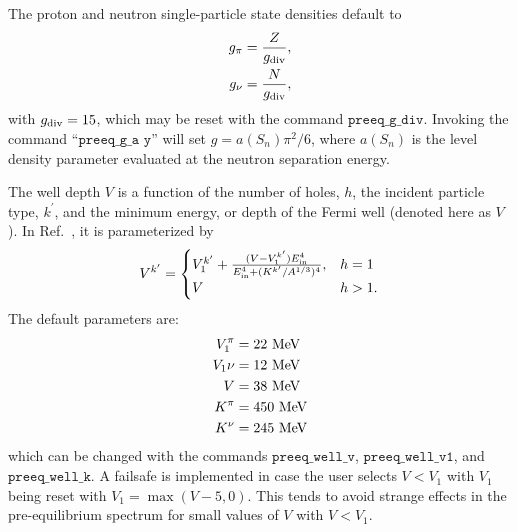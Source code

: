 \documentclass[
10pt,
showpacs,preprintnumbers,footinbib,
amsfonts,amsmath,amssymb,
aps,
prc,twocolumn,groupedaddress,superscriptaddress,
showkeys,
nofootinbib
]{revtex4-1}
\begin{document}
The proton and neutron single-particle state densities default to
\begin{align}
g_\pi & = \frac{Z}{g_{\rm div}},\\
g_\nu & = \frac{N}{g_{\rm div}},
\end{align}
with $g_{\rm div} = 15$, which may be reset with the command ${\texttt{preeq\_g\_div}}$. Invoking the command ``${\texttt{preeq\_g\_a y}}$'' will set $g = a(S_n)\pi^2/6$, where $a(S_n)$ is the level density parameter evaluated at the neutron separation energy.

The well depth $V$ is a function of the number of holes, $h$, the incident particle type, $k^\prime$, and the minimum energy,
or depth of the Fermi well (denoted here as $V$ ). In Ref.~\cite{Koning:2004}, it is parameterized by
\begin{equation}
V^{k^\prime} = 
\begin{cases}
V_1^{k^\prime} + \frac{(V-V_1^{k^\prime})E_{\rm in}^4}{E_{\rm in}^4 + (K^{k^\prime}/A^{1/3})^4}, & h = 1 \\
V  & h > 1.
\end{cases}
\end{equation}
The default parameters are:
\begin{align}
V_1^\pi & = 22~\text{MeV} \notag \\
V_1\nu & = 12~\text{MeV} \notag \\
V & = 38~\text{MeV} \notag \\
K^\pi & = 450~\text{MeV} \notag \\
K^\nu & = 245~\text{MeV} \notag \\
\end{align}
which can be changed with the commands ${\texttt{preeq\_well\_v}}$, ${\texttt{preeq\_well\_v1}}$, and ${\texttt{preeq\_well\_k}}$. A failsafe is implemented
in case the user selects $V < V_1$ with $V_1$ being reset with $V_1 = \max(V-5,0)$. This tends to avoid
strange effects in the pre-equilibrium spectrum for small values of $V$ with $V < V_1$.
\end{document}
